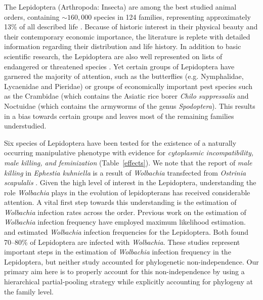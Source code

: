 \documentclass{frontiersSCNS}
\begin{document}
The Lepidoptera (Arthropoda: Insecta) are among the best studied animal orders, containing $\sim 160,000$ species in 124 families, representing approximately 13\% of all described life \citep{Regier:2013fp,vanNieukerken:2011a123}. Because of historic interest in their physical beauty and their contemporary economic importance, the literature is replete with detailed information regarding their distribution and life history. In addition to basic scientific research, the Lepidoptera are also well represented on lists of endangered or threatened species \citep{Hamm:2014wi}. Yet certain groups of Lepidoptera have garnered the majority of attention, such as the butterflies (e.g. Nymphalidae, Lycaenidae and Pieridae) or groups of economically important pest species such as the Crambidae (which contains the Asiatic rice borer \textit{Chilo suppressalis} and Noctuidae (which contains the armyworms of the genus \textit{Spodoptera}). This results in a bias towards certain groups and leaves most of the remaining families understudied. 

Six species of Lepidoptera have been tested for the existence of a naturally occurring manipulative phenotype with evidence for \emph{cytoplasmic incompatibility, male killing, \emph{and} feminization} (Table~\ref{effects}). We note that the report of \textit{male killing} in \textit{Ephestia kuhniella} is a result of \textit{Wolbachia} transfected from \textit{Ostrinia scapulalis} \citep{Fujii:2001p8208}. Given the high level of interest in the Lepidoptera, understanding the role \textit{Wolbachia} plays in the evolution of lepidopterans has received considerable attention. A vital first step towards this understanding is the estimation of \textit{Wolbachia} infection rates across the order. Previous work on the estimation of \emph{Wolbachia} infection frequency have employed maximum likelihood estimation. \cite{Ahmed:2015aa} and \cite{Weinert:2015aa} estimated \emph{Wolbachia} infection frequencies for the Lepidoptera. Both found 70--80\% of Lepidoptera are infected with \emph{Wolbachia}. These studies represent important steps in the estimation of \emph{Wolbachia} infection frequency in the Lepidoptera, but neither study accounted for phylogenetic non-independence. Our primary aim here is to properly account for this non-independence by using a hierarchical partial-pooling strategy while explicitly accounting for phylogeny at the family level. 
\end{document}
